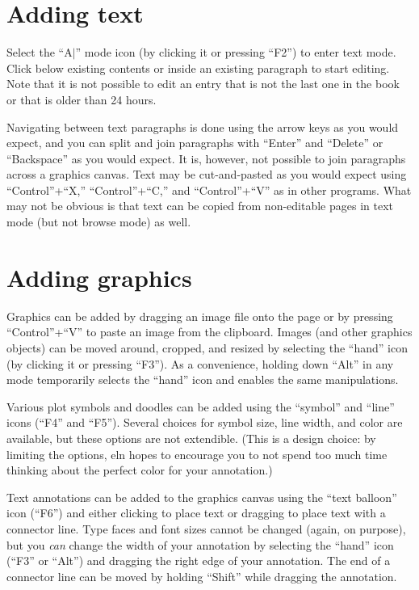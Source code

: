 \documentclass[11pt]{report}
\begin{document}
\section{Adding text}

Select the ``A\hbox{$|$}'' mode icon (by clicking it or
pressing ``F2'') to enter text mode. Click below existing contents or
inside an existing paragraph to start editing. Note that it is not
possible to edit an entry that is not the last one in the book or that
is older than 24 hours.

Navigating between text paragraphs is done using the arrow keys as you
would expect, and you can split and join paragraphs with ``Enter'' and
``Delete'' or ``Backspace'' as you would expect. It is, however, not
possible to join paragraphs across a graphics canvas. Text may be
cut-and-pasted as you would expect using ``Control''+``X,''
``Control''+``C,'' and ``Control''+``V'' as in other programs. What
may not be obvious is that text can be copied from non-editable pages
in text mode (but not browse mode) as well.

\section{Adding graphics}

Graphics can be added by dragging an image file onto the page or by
pressing ``Control''+``V'' to paste an image from the
clipboard. Images (and other graphics objects) can be moved around,
cropped, and resized by selecting the ``hand'' icon (by clicking it or
pressing ``F3''). As a convenience, holding down ``Alt'' in any mode
temporarily selects the ``hand'' icon and enables the same
manipulations.

Various plot symbols and doodles can be added using the ``symbol'' and
``line'' icons (``F4'' and ``F5''). Several choices for symbol size,
line width, and color are available, but these options are not
extendible. (This is a design choice: by limiting the options, eln
hopes to encourage you to not spend too much time thinking about the
perfect color for your annotation.) 

Text annotations can be added
to the graphics canvas using the ``text balloon'' icon (``F6'') and
either clicking to place text or dragging to place text with a
connector line. Type faces and font sizes cannot be changed (again, on
purpose), but you \emph{can} change the width of your annotation by
selecting the ``hand'' icon (``F3'' or ``Alt'') and dragging the right
edge of your annotation. The end of a connector line can be moved by
holding ``Shift'' while dragging the annotation.
\end{document}
